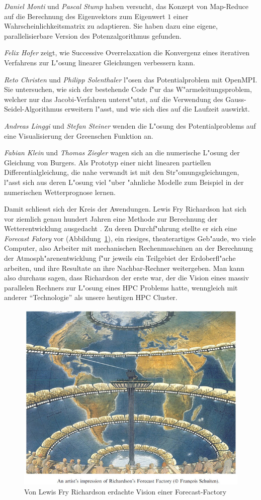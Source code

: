 {\em Daniel Monti} und {\em Pascal Stump} haben versucht, das Konzept
von Map-Reduce auf die Berechnung des Eigenvektors zum Eigenwert $1$
einer Wahrscheinlichkeitsmatrix zu adaptieren. Sie haben dazu eine eigene,
parallelisierbare Version des Potenzalgorithmus gefunden.

{\em Felix Hofer} zeigt, wie Successive Overrelaxation die
Konvergenz eines iterativen Verfahrens zur L"osung linearer Gleichungen
verbessern kann.

{\em Reto Christen} und {\em Philipp Solenthaler} l"osen das Potentialproblem
mit OpenMPI. Sie untersuchen, wie sich der bestehende Code f"ur das
W"armeleitungsproblem, welcher nur das Jacobi-Verfahren unterst"utzt,
auf die Verwendung des Gauss-Seidel-Algorithmus erweitern l"asst, und
wie sich dies auf die Laufzeit auswirkt.

{\em Andreas Linggi} und {\em Stefan Steiner} wenden die L"osung des
Potentialproblems auf eine Visualisierung der Greenschen Funktion an.

{\em Fabian Klein} und {\em Thomas Ziegler} wagen sich an die numerische
L"osung der Gleichung von Burgers. Als Prototyp einer nicht linearen
partiellen Differentialgleichung, die nahe verwandt ist mit den
Str"omungsgleichungen, l"asst sich aus deren L"osung viel "uber "ahnliche
Modelle zum Beispiel in der numerischen Wetterprognose lernen.

Damit schliesst sich der Kreis der Awendungen. Lewis Fry Richardson hat
sich vor ziemlich genau hundert Jahren eine Methode zur Berechnung der
Wetterentwicklung ausgedacht \cite{skript:richardson}.
Zu deren Durchf"uhrung stellte er sich
eine {\em Forecast Fatory} vor (Abbildung~\ref{forecastfactory}),
ein riesiges, theaterartiges Geb"aude,
wo viele Computer, also Arbeiter mit mechanischen Rechenmaschinen an der
Berechnung der Atmosph"arenentwicklung f"ur jeweils ein Teilgebiet
der Erdoberfl"ache arbeiten,
und ihre Resultate an ihre Nachbar-Rechner weitergeben. 
Man kann also durchaus sagen, dass Richardson der erste war, der die Vision
eines massiv parallelen Rechners zur L"osung eines HPC Problems hatte,
wenngleich mit anderer ``Technologie'' als unsere heutigen HPC Cluster.

\begin{figure}
\begin{center}
\includegraphics[width=\hsize]{images/forecast-factory-color.jpg}
\end{center}
\caption{Von Lewis Fry Richardson erdachte Vision einer Forecast-Factory
\label{forecastfactory}}
\end{figure}
